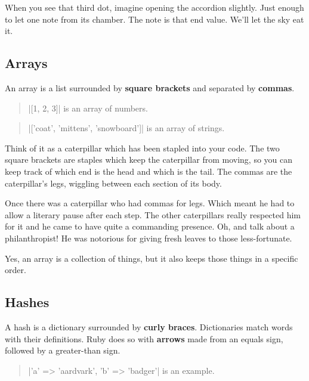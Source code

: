 \documentclass[12pt,twoside]{report}
\begin{document}
When you see that third dot, imagine opening the accordion slightly.
Just enough to let one note from its chamber.  The note is that end
value.  We'll let the sky eat it.



\subsection{Arrays}



An array is a list surrounded by {\bf square brackets} and separated
by {\bf commas}.

\begin{quote}
\rubyinline|[1, 2, 3]| is an array of
numbers.\end{quote}


\begin{quote}
\rubyinline|['coat', 'mittens', 'snowboard']| is an
array of strings.\end{quote}


Think of it as a caterpillar which has been stapled into your code.
The two square brackets are staples which keep the caterpillar from
moving, so you can keep track of which end is the head and which is
the tail.  The commas are the caterpillar's legs, wiggling between
each section of its body.

Once there was a caterpillar who had commas for legs.  Which meant he
had to allow a literary pause after each step.  The other caterpillars
really respected him for it and he came to have quite a commanding
presence.  Oh, and talk about a philanthropist!  He was notorious for
giving fresh leaves to those less-fortunate.

Yes, an array is a collection of things, but it also keeps those
things in a specific order.




\subsection{Hashes}



A hash is a dictionary surrounded by {\bf curly braces}.  Dictionaries
match words with their definitions.  Ruby does so with {\bf arrows}
made from an equals sign, followed by a greater-than sign.

\begin{quote}
\rubyinline|{'a' => 'aardvark', 'b' => 'badger'}| is
an example.\end{quote}
\end{document}
